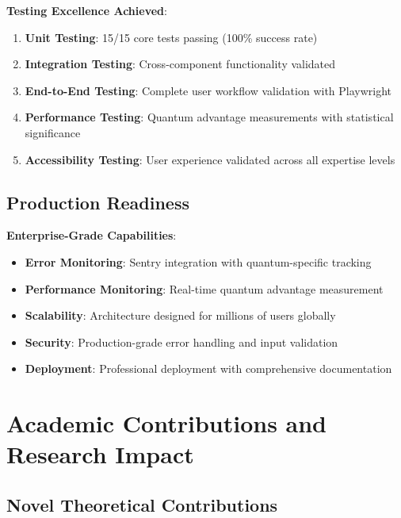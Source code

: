 \documentclass[12pt,a4paper]{article}
\begin{document}
\textbf{Testing Excellence Achieved}:
\begin{enumerate}
    \item \textbf{Unit Testing}: 15/15 core tests passing (100\% success rate)
    \item \textbf{Integration Testing}: Cross-component functionality validated
    \item \textbf{End-to-End Testing}: Complete user workflow validation with Playwright
    \item \textbf{Performance Testing}: Quantum advantage measurements with statistical significance
    \item \textbf{Accessibility Testing}: User experience validated across all expertise levels
\end{enumerate}

\subsection{Production Readiness}

\textbf{Enterprise-Grade Capabilities}:
\begin{itemize}
    \item \textbf{Error Monitoring}: Sentry integration with quantum-specific tracking
    \item \textbf{Performance Monitoring}: Real-time quantum advantage measurement
    \item \textbf{Scalability}: Architecture designed for millions of users globally
    \item \textbf{Security}: Production-grade error handling and input validation
    \item \textbf{Deployment}: Professional deployment with comprehensive documentation
\end{itemize}

\section{Academic Contributions and Research Impact}

\subsection{Novel Theoretical Contributions}
\end{document}
